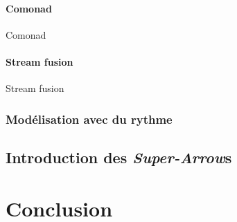 \documentclass{llncs}
\newcommand{\SAs}{\emph{Super-Arrow}s }
\begin{document}
\begin{lstlisting}[language=haskell]
\end{lstlisting}

\paragraph{Comonad}
Comonad~\cite{Brookes91}~\cite{Coutts07}
\paragraph{Stream fusion}
Stream fusion~\cite{Yi05}

\subsubsection{Modélisation avec du rythme}

\subsection{Introduction des \SAs}

\section{Conclusion}





\end{document}
